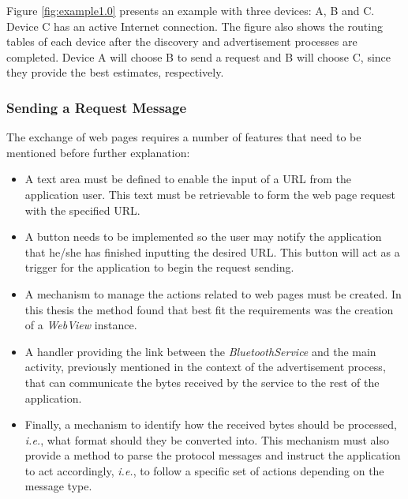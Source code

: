 Figure \ref{fig:example1.0} presents an example with three devices: A, B and C. Device C has an active Internet connection. The figure also shows the routing tables of each device after the discovery and advertisement processes are completed. Device A will choose B to send a request and B will choose C, since they provide the best estimates, respectively.


\subsubsection{Sending a Request Message}
\label{subsubsec:sendrqt}

The exchange of web pages requires a number of features that need to be mentioned before further explanation:

\begin{itemize}
	\item  A text area must be defined to enable the input of a \gls{URL} from the application user. This text must be retrievable to form the web page request with the specified \gls{URL}.
	
	\item A button needs to be implemented so the user may notify the application that he/she has finished inputting the desired \gls{URL}. This button will act as a trigger for the application to begin the request sending.
	
	\item A mechanism to manage the actions related to web pages must be created. In this thesis the method found that best fit the requirements was the creation of a \textit{WebView} instance.
	
	\item A handler providing the link between the \textit{BluetoothService} and the main activity, previously mentioned in the context of the advertisement process, that can communicate the bytes received by the service to the rest of the application.
	
	\item Finally, a mechanism to identify how the received bytes should be processed, \textit{i.e.}, what format should they be converted into. This mechanism must also provide a method to parse the protocol messages and instruct the application to act accordingly, \textit{i.e.}, to follow a specific set of actions depending on the message type.
\end{itemize}

